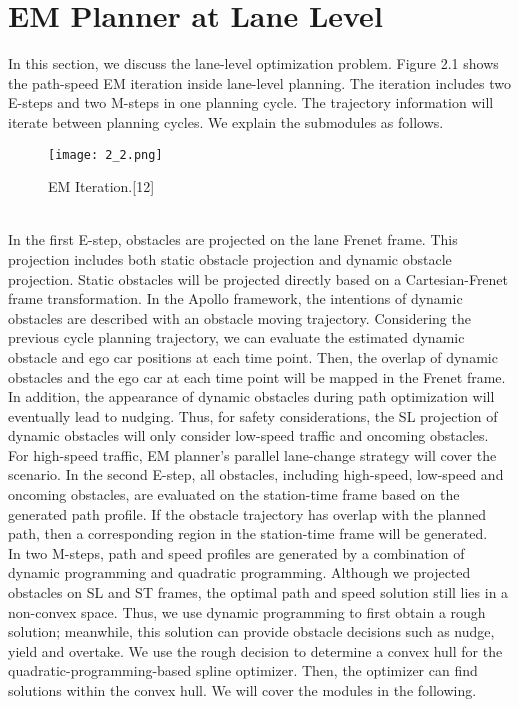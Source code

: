 \documentclass{report}
\begin{document}
\section{EM Planner at Lane Level}
In this section, we discuss the lane-level optimization problem. Figure 2.1 shows the path-speed EM iteration inside lane-level planning. The iteration includes two E-steps and two M-steps in one planning cycle. The trajectory information will iterate between planning cycles. We explain the submodules as follows.
    \begin{figure}[ht]
	\centering
	\texttt{[image: 2\_2.png]}
	\caption{EM Iteration.[12]}
	\label{fig:2.2} 
\end{figure}\\
\indent
In the first E-step, obstacles are projected on the lane Frenet frame. This projection includes both static obstacle projection and dynamic obstacle projection. Static obstacles will be projected directly based on a Cartesian-Frenet frame transformation. In the Apollo framework, the intentions of dynamic obstacles are described with an obstacle moving trajectory. Considering the previous cycle planning trajectory, we can evaluate the estimated dynamic obstacle and ego car positions at each time point. Then, the overlap of dynamic obstacles and the ego car at each time point will be mapped in the Frenet frame. In addition, the appearance of dynamic obstacles during path optimization will eventually lead to nudging. Thus, for safety considerations, the SL projection of dynamic obstacles will only consider low-speed traffic and oncoming obstacles. For high-speed traffic, EM planner’s parallel lane-change strategy will cover the scenario. In the second E-step, all obstacles, including high-speed, low-speed and oncoming obstacles, are evaluated on the station-time frame based on the generated path profile. If the obstacle trajectory has overlap with the planned path, then a corresponding region in the station-time frame will be generated.\\
\indent
In two M-steps, path and speed profiles are generated by a combination of dynamic programming and quadratic programming. Although we projected obstacles on SL and ST frames, the optimal path and speed solution still lies in a non-convex space. Thus, we use dynamic programming to first obtain a rough solution; meanwhile, this solution can provide obstacle decisions such as nudge, yield and overtake. We use the rough decision to determine a convex hull for the quadratic-programming-based spline optimizer. Then, the optimizer can find solutions within the convex hull. We will cover the modules in the following.
\end{document}
